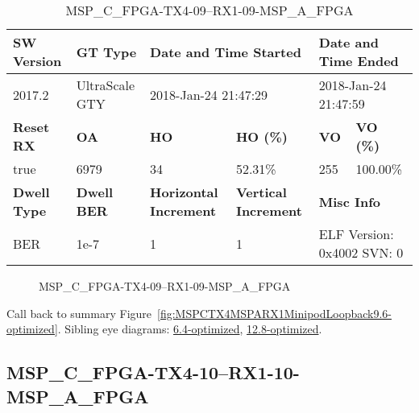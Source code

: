 \begin{table}[h]
\centering
\caption{MSP\_C\_FPGA-TX4-09--RX1-09-MSP\_A\_FPGA}
\label{tab:MSPCFPGATX409RX109MSPAFPGA9.6-optimized}
\begin{tabular}{@{}|l|l|l|l|l|l|@{}}
\toprule
\textbf{SW Version}                & \textbf{GT Type}   & \multicolumn{2}{l|}{\textbf{Date and Time Started}}            & \multicolumn{2}{l|}{\textbf{Date and Time Ended}}        \\ \midrule
2017.2                       & UltraScale GTY          & \multicolumn{2}{l|}{2018-Jan-24 21:47:29}                   & \multicolumn{2}{l|}{2018-Jan-24 21:47:59}               \\ \midrule
\textbf{Reset RX}                  & \textbf{OA} & \textbf{HO}   & \textbf{HO (\%)} & \textbf{VO} & \textbf{VO (\%)} \\ \midrule
true & 6979        & 34          & 52.31\%        & 255        & 100.00\%       \\ \midrule
\textbf{Dwell Type}                & \textbf{Dwell BER} & \textbf{Horizontal Increment} & \textbf{Vertical Increment}    & \multicolumn{2}{l|}{\textbf{Misc Info}}                  \\ \midrule
BER                            & 1e-7        & 1        & 1           & \multicolumn{2}{l|}{ELF Version: 0x4002 SVN: 0}                         \\ \bottomrule
\end{tabular}
\end{table}

\begin{figure}[h]
\caption{MSP\_C\_FPGA-TX4-09--RX1-09-MSP\_A\_FPGA} \label{fig:MSPCFPGATX409RX109MSPAFPGA9.6-optimized}
\end{figure}

Call back to summary Figure~\ref{fig:MSPCTX4MSPARX1MinipodLoopback9.6-optimized}.
Sibling eye diagrams: \hyperref[sec:MSPCFPGATX409RX109MSPAFPGA6.4-optimized]{6.4-optimized}, \hyperref[sec:MSPCFPGATX409RX109MSPAFPGA12.8-optimized]{12.8-optimized}.

\clearpage
\newpage


\subsection{MSP\_C\_FPGA-TX4-10--RX1-10-MSP\_A\_FPGA}\label{sec:MSPCFPGATX410RX110MSPAFPGA9.6-optimized}

